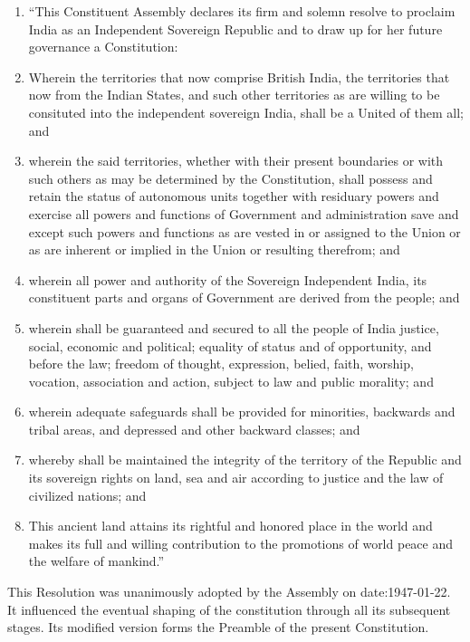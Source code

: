 \begin{multicols}{2}
\begin{enumerate}
  \item \textquotedblleft This Constituent Assembly declares its firm and solemn resolve to proclaim India as an Independent Sovereign Republic and to draw up for her future governance a Constitution:
  \item Wherein the territories that now comprise British India, the territories that now from the Indian States, and such other territories as are willing to be consituted into the independent sovereign India, shall be a United of them all; and
  \item wherein the said territories, whether with their present boundaries or with such others as may be determined by the Constitution, shall possess and retain the status of autonomous units together with residuary powers and exercise all powers and functions of Government and administration save and except such powers and functions as are vested in or assigned to the Union or as are inherent or implied in the Union or resulting therefrom; and
  \item wherein all power and authority of the Sovereign Independent India, its constituent parts and organs of Government are derived from the people; and
  \item wherein shall be guaranteed and secured to all the people of India justice, social, economic and political; equality of status and of opportunity, and before the law; freedom of thought, expression, belied, faith, worship, vocation, association and action, subject to law and public morality; and
  \item wherein adequate safeguards shall be provided for minorities, backwards and tribal areas, and depressed and other backward classes; and
  \item whereby shall be maintained the integrity of the territory of the Republic and its sovereign rights on land, sea and air according to justice and the law of civilized nations; and
  \item This ancient land attains its rightful and honored place in the world and makes its full and willing contribution to the promotions of world peace and the welfare of mankind.\textquotedblright

\end{enumerate}

This Resolution was unanimously adopted by the Assembly on \gls{date:1947-01-22}. It influenced the eventual shaping of the constitution through all its subsequent stages. Its modified version forms the Preamble of the present Constitution.


\end{multicols}

